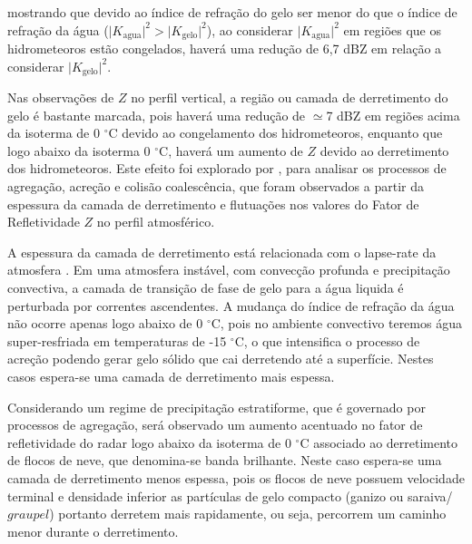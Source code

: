 mostrando que devido ao índice de refração do gelo ser menor do que o índice de refração da água ($\vert K_{\mathrm{agua}}\vert^2 > \vert K_{\mathrm{gelo}}\vert^2$), ao considerar $\vert K_{\mathrm{agua}}\vert^2$ em regiões que os hidrometeoros estão congelados, haverá uma redução de 6,7 dBZ em relação a considerar $\vert K_{\mathrm{gelo}}\vert^2$.  

Nas observações de $Z$ no perfil vertical, a região ou camada de derretimento do gelo é bastante marcada, pois haverá uma redução de $\simeq$7 dBZ em regiões acima da isoterma de 0 $^{\circ}$C devido ao congelamento dos hidrometeoros, enquanto que logo abaixo da isoterma 0 $^{\circ}$C, haverá um aumento de $Z$ devido ao derretimento dos hidrometeoros. Este efeito foi explorado por  , para analisar os processos  de  agregação, acreção e colisão coalescência, que foram observados a partir da espessura da camada de derretimento e flutuações nos valores do Fator de Refletividade $Z$ no perfil atmosférico. 

A espessura da camada de derretimento está relacionada com o lapse-rate da atmosfera \cite[p.~462]{mason1971_2ed}. Em uma atmosfera instável, com convecção profunda e precipitação convectiva, a camada de transição de fase de gelo para a água liquida é perturbada por correntes ascendentes. A mudança do índice de refração da água não ocorre apenas logo abaixo de 0 $^{\circ}$C, pois no ambiente convectivo teremos água super-resfriada em temperaturas de -15 $^{\circ}$C, o que intensifica o processo de acreção podendo gerar gelo sólido que cai derretendo até a superfície. Nestes casos espera-se uma camada de derretimento mais espessa.

Considerando um regime de precipitação estratiforme, que é governado por processos de agregação, será observado um aumento acentuado no fator de refletividade do radar logo abaixo da isoterma de 0 $^{\circ}$C associado ao derretimento de flocos de neve, que denomina-se banda brilhante. Neste caso espera-se uma camada de derretimento menos espessa, pois os flocos de neve possuem velocidade terminal e densidade inferior as partículas de gelo compacto (ganizo ou saraiva/$graupel$) portanto derretem mais rapidamente, ou seja, percorrem um caminho menor durante o derretimento. 



